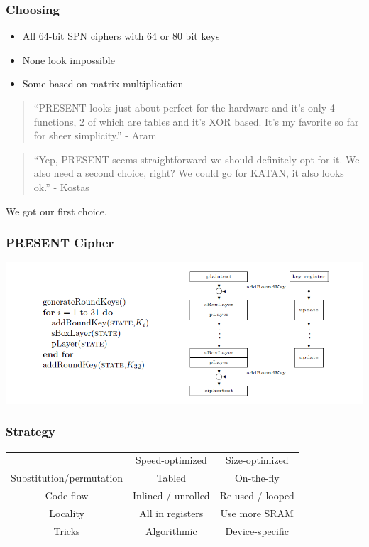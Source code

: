 \documentclass{beamer}
\begin{document}
\begin{frame}[fragile]
\frametitle{Choosing}
\begin{itemize}
\item All 64-bit SPN ciphers with 64 or 80 bit keys
\item None look impossible
\item Some based on matrix multiplication
\end{itemize}
\begin{quote}
``PRESENT looks just about perfect for the hardware and it's only 4
functions, 2 of which are tables and it's XOR based. It's my favorite
so far for sheer simplicity.'' - Aram
\end{quote}

\begin{quote}
``Yep, PRESENT seems straightforward we should definitely opt for it.
We also need a second choice, right? We could go for KATAN, it also looks ok.'' - Kostas
\end{quote}
We got our first choice.
\end{frame}


\begin{frame}[fragile]
\frametitle{PRESENT Cipher}
\includegraphics[width=\textwidth]{cipher}
\end{frame}

\begin{frame}[fragile]
\frametitle{Strategy}
\begin{tabular}{c c c }
	& Speed-optimized & Size-optimized \\
Substitution/permutation & Tabled & On-the-fly \\
Code flow & Inlined / unrolled & Re-used / looped \\
Locality & All in registers & Use more SRAM \\
Tricks & Algorithmic & Device-specific \\

\end{tabular}
\end{frame}
\end{document}
